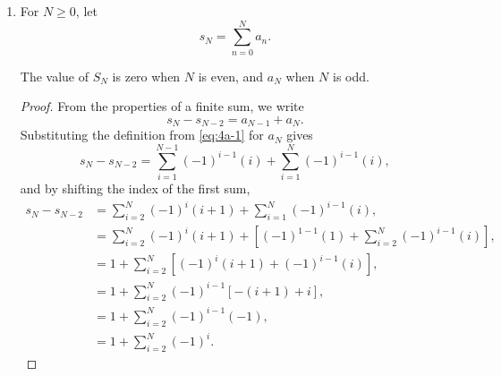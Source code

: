 \begin{enumerate}
\begin{enumerate}
                Let $k$ be a natural number. Observe that by \cref{prop:4a},
                \[ f(2k - 1) = f(2(k - 1) - 1) = (k - 1) + 1 = k, \]
                and
                \[ f(2k) = -k. \]

                It follows that $f^{-1}(k) = 2k - 1$ and $f^{-1}(-k) = 2k$. This can be expressed more generally as
                \[
                    f^{-1}(n) =
                    \begin{cases}
                        2n - 1 & \text{if $n > 0$}, \\
                        -2n & \text{if $n \le 0$}.
                    \end{cases}
                \]

                Note that this definition of the inverse is correct for $n = 0$ because $f(0) = 0$ and $f^{-1}(0) = -2(0) = 0$.

                \bigskip

            \item For $N \ge 0$, let
                \[ s_N = \sum_{n = 0}^N a_n. \]

                \bigskip

                \begin{proposition} \label{prop:4c}
                    The value of $S_N$ is zero when $N$ is even, and $a_N$ when $N$ is odd.
                \end{proposition}

                \medskip

                \begin{proof}
                    From the properties of a finite sum, we write
                    \[ s_N - s_{N - 2} = a_{N - 1} + a_N. \]
                    Substituting the definition from \cref{eq:4a-1} for $a_N$ gives
                    \[
                        s_N - s_{N - 2} = \sum_{i = 1}^{N - 1} (-1)^{i - 1} (i) + \sum_{i = 1}^N (-1)^{i - 1} (i),
                    \]
                    and by shifting the index of the first sum,
                    \begin{align*}
                        s_N - s_{N - 2} &= \sum_{i = 2}^{N} (-1)^{i} (i + 1) + \sum_{i = 1}^N (-1)^{i - 1} (i), \\
                        &= \sum_{i = 2}^N (-1)^i (i + 1) + \left[(-1)^{1 - 1} (1) + \sum_{i = 2}^N (-1)^{i - 1} (i)\right], \\
                        &= 1 + \sum_{i = 2}^N \left[(-1)^i (i + 1) + (-1)^{i - 1} (i)\right], \\
                        &= 1 + \sum_{i = 2}^N (-1)^{i - 1} \left[-(i + 1) + i \right], \\
                        &= 1 + \sum_{i = 2}^N (-1)^{i - 1} (-1), \\
                        &= 1 + \sum_{i = 2}^N (-1)^i.
                    \end{align*}


\end{proof}
\end{enumerate}
\end{enumerate}
